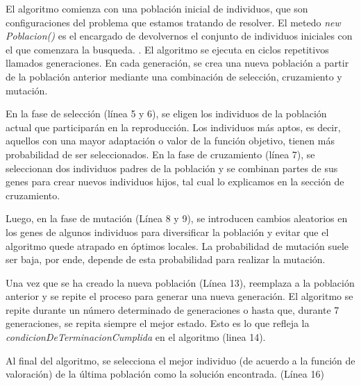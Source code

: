 


El algoritmo comienza con una población inicial de individuos, que son configuraciones del problema que estamos tratando de resolver. El metedo \emph{new Poblacion()} 
es el encargado de devolvernos el conjunto de individuos iniciales con el que comenzara la busqueda.
.
El algoritmo se ejecuta en ciclos repetitivos llamados generaciones. En cada generación, se crea una nueva población a partir de la población anterior mediante una combinación de selección, cruzamiento y mutación.

En la fase de selección (línea 5 y 6), se eligen los individuos de la población actual que participarán en la reproducción.
Los individuos más aptos, es decir, aquellos con una mayor adaptación o valor de la función objetivo, tienen más probabilidad de ser seleccionados.
En la fase de cruzamiento (línea 7), se seleccionan dos individuos padres de la población y se combinan partes de sus genes para crear nuevos individuos hijos, tal cual lo explicamos en la sección de cruzamiento. 

Luego, en la fase de mutación (Línea 8 y 9), se introducen cambios aleatorios en los genes de algunos individuos para diversificar la población y evitar que el algoritmo quede atrapado en óptimos locales. 
La probabilidad de mutación suele ser baja, por ende, depende de esta probabilidad para realizar la mutación.

Una vez que se ha creado la nueva población (Línea 13), reemplaza a la población anterior y se repite el proceso para generar una nueva generación. 
El algoritmo se repite durante un número determinado de generaciones o hasta que, durante 7 generaciones, se repita siempre el mejor estado. Esto es lo que refleja la \emph{condicionDeTerminacionCumplida}
en el algoritmo (linea 14).

Al final del algoritmo, se selecciona el mejor individuo (de acuerdo a la función de valoración) de la última población como la solución encontrada. (Línea 16)

